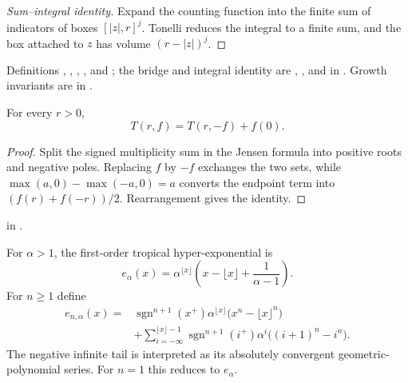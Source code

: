 \begin{proof}[Sum--integral identity]
\leanok
Expand the counting function into the finite sum of indicators of boxes
$[|z|,r]^j$.  Tonelli reduces the integral to a finite sum, and the box
attached to $z$ has volume $(r-|z|)^j$.
\end{proof}

\begin{leanproof}
Definitions , ,
, , and
; the bridge and integral identity are
,
, and
 in
.  Growth invariants are in
.
\end{leanproof}

\begin{theorem}
\leanok
{}
For every $r>0$,
\[
                         T(r,f)=T(r,-f)+f(0).
\]
\end{theorem}

\begin{proof}
\leanok
Split the signed multiplicity sum in the Jensen formula into positive roots
and negative poles.  Replacing $f$ by $-f$ exchanges the two sets, while
$\max(a,0)-\max(-a,0)=a$ converts the endpoint term into
$(f(r)+f(-r))/2$.  Rearrangement gives the identity.
\end{proof}

\begin{leanproof}
 in
.
\end{leanproof}

\begin{definition}
\leanok
For $\alpha>1$, the first-order tropical hyper-exponential is
\[
e_\alpha(x)=\alpha^{\lfloor x\rfloor}
\left(x-\lfloor x\rfloor+\frac1{\alpha-1}\right).
\]
For $n\geq1$ define
\begin{align*}
e_{n,\alpha}(x)={}&
\operatorname{sgn}^{n+1}(x^+)\alpha^{\lfloor x\rfloor}
\bigl(x^n-\lfloor x\rfloor^n\bigr)\\
&+\sum_{i=-\infty}^{\lfloor x\rfloor-1}
\operatorname{sgn}^{n+1}(i^+)\alpha^i
\bigl((i+1)^n-i^n\bigr).
\end{align*}
The negative infinite tail is interpreted as its absolutely convergent
geometric-polynomial series.  For $n=1$ this reduces to $e_\alpha$.
\end{definition}

